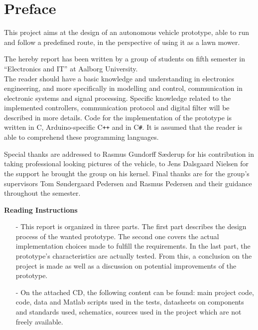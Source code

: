 \chapter*{Preface}
\vspace{-3 pt}
This project aims at the design of an autonomous vehicle prototype, able to run and follow a predefined route, in the perspective of using it as a lawn mower.

The hereby report has been written by a group of students on fifth semester in ``Electronics and IT'' at Aalborg University.\\
The reader should have a basic knowledge and understanding in electronics engineering, and more specifically in modelling and control, communication in electronic systems and signal processing. Specific knowledge related to the implemented controllers, communication protocol and digital filter will be described in more details. Code for the implementation of the prototype is written in C, Arduino-specific C\texttt{++} and in C\texttt{\#}. It is assumed that the reader is able to comprehend these programming languages.

Special thanks are addressed to Rasmus Gundorff Sæderup for his contribution in taking professional looking pictures of the vehicle, to Jens Dalsgaard Nielsen for the support he brought the group on his kernel. Final thanks are for the group's supervisors Tom Søndergaard Pedersen and Rasmus Pedersen and their guidance throughout the semester.

\textbf{Reading Instructions}
\vspace{-7 pt}
\begin{itemize}
\item[-] This report is organized in three parts. The first part describes the design process of the wanted prototype. The second one covers the actual implementation choices made to fulfill the requirements. In the last part, the prototype's characteristics are actually tested. From this, a conclusion on the project is made as well as a discussion on potential improvements of the prototype.
\item[-] On the attached CD, the following content can be found: main project code, code, data and Matlab scripts used in the tests, datasheets on components and standards used, schematics, sources used in the project which are not freely available.
\end{itemize}



